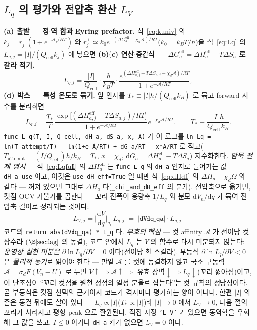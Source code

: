 \documentclass[11pt,a4paper]{article}
\newcommand{\dd}{\mathrm{d}}
\newcommand{\eff}{\mathrm{eff}}
\newcommand{\cell}{\mathrm{cell}}
\newcommand{\code}[1]{\texttt{#1}}
\begin{document}
\subsection{$L_q$ 의 평가와 전압축 환산 $L_V$}
\textbf{(a) 출발 — 정$\cdot$역 합과 Eyring prefactor.} 식~\eqref{eq:kuniv} 의 $k_j=r_j^+(1+e^{-\mathcal A_j/RT})$ 와
$r_j^+\simeq k_0e^{-(\Delta G_a^\eff-\chi_d\mathcal A)/RT}$($k_0=k_BT/h$)을 식~\eqref{eq:Lq} 의 $L_{q,j}=|I|/(Q_\cell k_j)$
에 넣으면 \textbf{(b)(c) 연산$\cdot$중간식 — $\Delta G_a^\eff=\Delta H_a^\eff-T\Delta S_a$ 로 갈라 적기.}
\begin{equation}
L_{q,j}=\frac{|I|}{Q_\cell}\cdot\frac{h}{k_BT}\cdot
\frac{e^{(\Delta H_{a,j}^\eff-T\Delta S_{a,j}-\chi_d\mathcal A)/RT}}{1+e^{-\mathcal A/RT}},
\label{eq:Lqmid2}
\end{equation}
\textbf{(d) 박스 — 특성 온도로 묶기.} 앞 인자를 $T_*\equiv|I|h/(Q_\cell k_B)$ 로 묶고 forward 지수를 분리하면
\begin{equation}
L_{q,j}=\frac{T_*}{T}\,\frac{\exp\!\big[(\Delta H_{a,j}^\eff-T\Delta S_{a,j})/RT\big]}{1+e^{-\mathcal A/RT}}
\,e^{-\chi_d\mathcal A/RT},
\qquad T_*\equiv\frac{|I|\,h}{Q_\cell\,k_B}.
\label{eq:Lqfull}
\end{equation}
\code{func\_L\_q(T, I, Q\_cell, dH\_a, dS\_a, x, A)} 가 이 로그를
\code{ln\_Lq = ln(T\_attempt/T) - ln(1+e\^{-A/RT}) + dG\_a/RT - x*A/RT} 로 적고($T_\mathrm{attempt}=(I/Q_\cell)h/k_B=T_*$,
$x=\chi_d$, $\dd G_a=\Delta H_a^\eff-T\Delta S_a$) 지수화한다. \emph{암묵 전제 명시} — 식~\eqref{eq:Lqfull} 의
$\Delta H_a^\eff$ 는 \code{func\_L\_q} 의 \code{dH\_a} 인자로 들어가는 값 \code{dH\_a\_use} 이고, 이것은
\code{use\_dH\_eff=True} 일 때만 식~\eqref{eq:dHeff} 의 $\Delta H_a-\chi_d\Omega$ 와 같다 — 꺼져 있으면 그대로
$\Delta H_a$ 다(\code{\_chi\_and\_dH\_eff} 의 분기). 전압축으로 옮기면, 컷점 OCV 기울기를 곱한다 — 꼬리 진폭이
용량축 $1/L_q$ 와 분모 $\dd V_n/\dd q$ 가 묶여 전압축 길이로 정리되는 것이다:
\begin{equation}
\boxed{\;L_{V,j}=\Big|\frac{\dd V}{\dd q}\Big|_{q_a}\,L_{q,j}\;=\;|\code{dVdq\_qa}|\cdot L_{q,j}\;.}
\label{eq:LV}
\end{equation}
코드의 \code{return abs(dVdq\_qa) * L\_q} 다. \emph{부호의 핵심} — 컷 affinity $\mathcal A$ 가 전이당 컷 상수라
($\S\ref{sec:lag}$ 의 동결), 코드 안에서 $L_q$ 는 $V$ 의 함수로 다시 미분되지 않는다: \emph{운영상 실현 미분은}
$\partial\ln L_q/\partial V=0$ 이다(전이당 한 스칼라). 부등식 $\partial\ln L_q/\partial V<0$ 은 \emph{물리적 동기}로 읽어야
한다 — 만일 $\mathcal A$ 를 컷에 동결하지 않고 국소 구동력 $\mathcal A=\sigma_dF(V_n-U)$ 로 두면 $V\!\uparrow\Rightarrow
\mathcal A\!\uparrow\Rightarrow$ 유효 장벽$\downarrow\Rightarrow L_q\downarrow$(꼬리 짧아짐)이고, 이 단조성이 ``꼬리 컷점을
원천 정점의 일정 분율로 잡는다''는 컷 규칙의 정당성이다. 곧 부등식은 컷점 선택의 근거이지 코드가 격자마다 평가하는 양이
아니다. 한편 $|I|$ 의존은 동결 뒤에도 살아 있다 — $L_q\propto|I|$($T_*\propto|I|$)라 $|I|\to0$
에서 $L_V\to0$, 다음 절의 꼬리가 사라지고 평형 peak 으로 환원된다. 직접 지정 \code{'L\_V'} 가 있으면 동역학을 우회해
그 값을 쓰고, $I\le0$ 이거나 \code{dH\_a} 키가 없으면 $L_V=0$ 이다.
\end{document}
